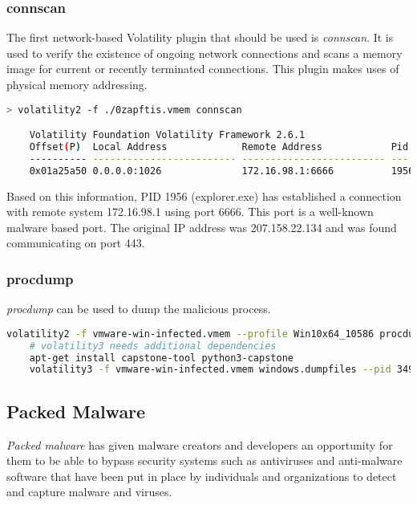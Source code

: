 \subsubsection{connscan}
The first network-based Volatility plugin that should be used is \textit{connscan}. It is used to verify the existence of ongoing network connections and scans a memory image for current or recently terminated connections. This plugin makes uses of physical memory addressing.

\begin{lstlisting}[language=bash]
    > volatility2 -f ./0zapftis.vmem connscan

    Volatility Foundation Volatility Framework 2.6.1
    Offset(P)  Local Address             Remote Address            Pid
    ---------- ------------------------- ------------------------- ---
    0x01a25a50 0.0.0.0:1026              172.16.98.1:6666          1956
\end{lstlisting}

Based on this information, PID 1956 (explorer.exe) has established a connection with remote system 172.16.98.1 using port 6666. This port is a well-known malware based port. The original IP address was 207.158.22.134 and was found communicating on port 443.


\subsubsection{procdump}
\textit{procdump} can be used to dump the malicious process.

\begin{lstlisting}[language=bash]
    volatility2 -f vmware-win-infected.vmem --profile Win10x64_10586 procdump --pid 3496 --dump-dir .
    # volatility3 needs additional dependencies
    apt-get install capstone-tool python3-capstone
    volatility3 -f vmware-win-infected.vmem windows.dumpfiles --pid 3496
\end{lstlisting}

\subsection{Packed Malware}
\textit{Packed malware} has given malware creators and developers an opportunity for them to be able to bypass security systems such as antiviruses and anti-malware software that have been put in place by individuals and organizations to detect and capture malware and viruses.\\

